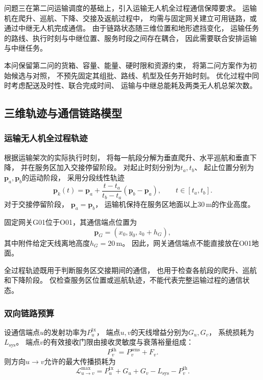 \documentclass[bwprint]{gmcmthesis}
\begin{document}
问题三在第二问运输调度的基础上，引入运输无人机全过程通信保障要求。
运输机在爬升、巡航、下降、交接及返航过程中，
均需与固定网关建立可用链路，或通过中继无人机完成通信。
由于链路状态随三维位置和地形遮挡变化，
运输任务的路线、执行时刻与中继位置、服务时段之间存在耦合，
因此需要联合安排运输与中继任务。

本问保留第二问的货箱、容量、能量、硬时限和资源约束，
将第二问方案作为初始候选与对照，
不预先固定其组批、路线、机型及任务开始时刻。
优化过程中同时考虑配送及时性、联合完成时间、
运输与中继总能耗及两类无人机总架次数。

\subsection{三维轨迹与通信链路模型}

\subsubsection{运输无人机全过程轨迹}

根据运输架次的实际执行时刻，
将每一航段分解为垂直爬升、水平巡航和垂直下降，
并在服务区加入交接停留阶段。
对起止时刻分别为$t_a,t_b$、
起止位置分别为$\boldsymbol{p}_a,\boldsymbol{p}_b$的运动阶段，
采用分段线性轨迹
\begin{equation}
    \boldsymbol{p}_k(t)
    =
    \boldsymbol{p}_a
    +
    \frac{t-t_a}{t_b-t_a}
    \left(\boldsymbol{p}_b-\boldsymbol{p}_a\right),
    \qquad t\in[t_a,t_b].
    \label{eq:q3_trajectory}
\end{equation}
对于交接停留阶段，
$\boldsymbol{p}_a=\boldsymbol{p}_b$，
运输机保持在服务区地面以上$30\,\mathrm{m}$的作业高度。

固定网关G01位于O01，其通信端点位置为
\begin{equation}
    \boldsymbol{p}_{G}
    =
    (x_0,y_0,z_0+h_G),
\end{equation}
其中附件给定天线离地高度$h_G=20\,\mathrm{m}$。
因此，网关通信端点不能直接放在O01地面。

全过程轨迹既用于判断服务区交接期间的通信，
也用于检查各航段的爬升、巡航和下降阶段。
仅检查服务区位置或巡航轨迹，不能代表完整运输过程的通信状态。

\subsubsection{双向链路预算}

设通信端点$u$的发射功率为$P_u^{\mathrm{tx}}$，
端点$u,v$的天线增益分别为$G_u,G_v$，
系统损耗为$L_{\mathrm{sys}}$。
端点$v$的有效接收门限由接收灵敏度与衰落裕量组成：
\begin{equation}
    P_v^{\mathrm{th}}
    =
    P_v^{\mathrm{sens}}+F_v.
\end{equation}
则方向$u\to v$允许的最大传播损耗为
\begin{equation}
    \mathcal{L}_{u\to v}^{\max}
    =
    P_u^{\mathrm{tx}}
    +G_u+G_v
    -L_{\mathrm{sys}}
    -P_v^{\mathrm{th}}.
\end{equation}
\end{document}
